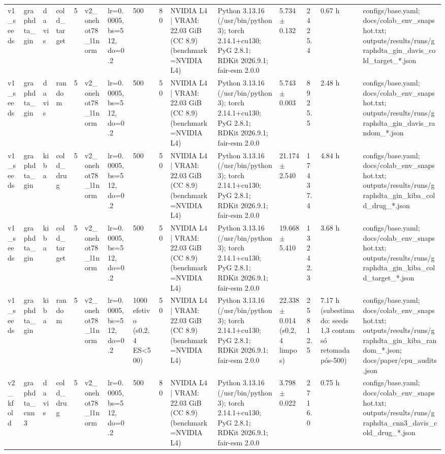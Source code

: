 \begin{table}[htbp]
\begin{tabular}{lllllllllllllll}
v1\_seeds & graphdta\_gin & davis & cold\_target & 5 & v2\_onehot78\_l1norm & lr=0.0005, bs=512, do=0.2 & 500 & 80 & NVIDIA L4 | VRAM: 22.03 GiB (CC 8.9) (benchmark=NVIDIA L4) & Python 3.13.16 (/usr/bin/python3); torch 2.14.1+cu130; PyG 2.8.1; RDKit 2026.9.1; fair-esm 2.0.0 & 5.734 $\pm$ 0.132 & 2425.4 & 0.67 h & configs/base.yaml; docs/colab\_env\_snapshot.txt; outputs/results/runs/graphdta\_gin\_davis\_cold\_target\_*.json \\
v1\_seeds & graphdta\_gin & davis & random & 5 & v2\_onehot78\_l1norm & lr=0.0005, bs=512, do=0.2 & 500 & 50 & NVIDIA L4 | VRAM: 22.03 GiB (CC 8.9) (benchmark=NVIDIA L4) & Python 3.13.16 (/usr/bin/python3); torch 2.14.1+cu130; PyG 2.8.1; RDKit 2026.9.1; fair-esm 2.0.0 & 5.743 $\pm$ 0.003 & 8925.5 & 2.48 h & configs/base.yaml; docs/colab\_env\_snapshot.txt; outputs/results/runs/graphdta\_gin\_davis\_random\_*.json \\
v1\_seeds & graphdta\_gin & kiba & cold\_drug & 5 & v2\_onehot78\_l1norm & lr=0.0005, bs=512, do=0.2 & 500 & 50 & NVIDIA L4 | VRAM: 22.03 GiB (CC 8.9) (benchmark=NVIDIA L4) & Python 3.13.16 (/usr/bin/python3); torch 2.14.1+cu130; PyG 2.8.1; RDKit 2026.9.1; fair-esm 2.0.0 & 21.174 $\pm$ 2.540 & 17437.4 & 4.84 h & configs/base.yaml; docs/colab\_env\_snapshot.txt; outputs/results/runs/graphdta\_gin\_kiba\_cold\_drug\_*.json \\
v1\_seeds & graphdta\_gin & kiba & cold\_target & 5 & v2\_onehot78\_l1norm & lr=0.0005, bs=512, do=0.2 & 500 & 50 & NVIDIA L4 | VRAM: 22.03 GiB (CC 8.9) (benchmark=NVIDIA L4) & Python 3.13.16 (/usr/bin/python3); torch 2.14.1+cu130; PyG 2.8.1; RDKit 2026.9.1; fair-esm 2.0.0 & 19.668 $\pm$ 5.410 & 13242.3 & 3.68 h & configs/base.yaml; docs/colab\_env\_snapshot.txt; outputs/results/runs/graphdta\_gin\_kiba\_cold\_target\_*.json \\
v1\_seeds & graphdta\_gin & kiba & random & 5 & v2\_onehot78\_l1norm & lr=0.0005, bs=512, do=0.2 & 1000 efetivo (s0,2,4 ES<500) & 50 & NVIDIA L4 | VRAM: 22.03 GiB (CC 8.9) (benchmark=NVIDIA L4) & Python 3.13.16 (/usr/bin/python3); torch 2.14.1+cu130; PyG 2.8.1; RDKit 2026.9.1; fair-esm 2.0.0 & 22.338 $\pm$ 0.014 (s0,2,4 limpos) & 25812.5 & 7.17 h (subestimado: seeds 1,3 contam só retomada pós-500) & configs/base.yaml; docs/colab\_env\_snapshot.txt; outputs/results/runs/graphdta\_gin\_kiba\_random\_*.json; docs/paper/cpu\_audits.json \\
v2\_kfold & graphdta\_cnn3 & davis & cold\_drug & 5 & v2\_onehot78\_l1norm & lr=0.0005, bs=512, do=0.2 & 500 & 80 & NVIDIA L4 | VRAM: 22.03 GiB (CC 8.9) (benchmark=NVIDIA L4) & Python 3.13.16 (/usr/bin/python3); torch 2.14.1+cu130; PyG 2.8.1; RDKit 2026.9.1; fair-esm 2.0.0 & 3.798 $\pm$ 0.022 & 2716.0 & 0.75 h & configs/base.yaml; docs/colab\_env\_snapshot.txt; outputs/results/runs/graphdta\_cnn3\_davis\_cold\_drug\_*.json \\

\end{tabular}
\end{table}
